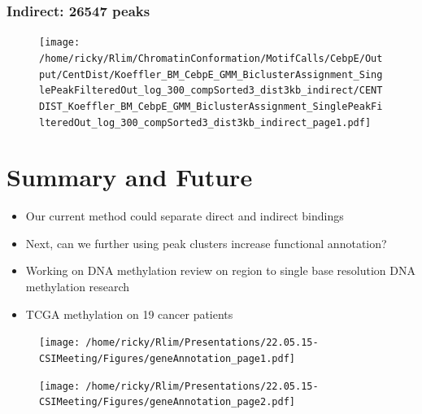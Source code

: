 \documentclass[notes]{beamer}
\begin{document}
\begin{frame}[plain]
    \frametitle{Indirect: 26547 peaks}
    \begin{figure}
        \texttt{[image: /home/ricky/Rlim/ChromatinConformation/MotifCalls/CebpE/Output/CentDist/Koeffler\_BM\_CebpE\_GMM\_BiclusterAssignment\_SinglePeakFilteredOut\_log\_300\_compSorted3\_dist3kb\_indirect/CENTDIST\_Koeffler\_BM\_CebpE\_GMM\_BiclusterAssignment\_SinglePeakFilteredOut\_log\_300\_compSorted3\_dist3kb\_indirect\_page1.pdf]}
    \end{figure}
\end{frame}

\section{Summary and Future}
    \begin{frame}
        \begin{itemize}[<+->]
            \item Our current method could separate direct and indirect bindings 
            \item Next, can we further using peak clusters increase functional annotation?
            \item Working on DNA methylation review on region to single base resolution DNA methylation research
            \item TCGA methylation on 19 cancer patients
        \end{itemize}
    \end{frame} 

\begin{frame}[plain]
    \begin{figure}
        \texttt{[image: /home/ricky/Rlim/Presentations/22.05.15-CSIMeeting/Figures/geneAnnotation\_page1.pdf]}
    \end{figure}
\end{frame}

\begin{frame}[plain]
    \begin{figure}
        \texttt{[image: /home/ricky/Rlim/Presentations/22.05.15-CSIMeeting/Figures/geneAnnotation\_page2.pdf]}
    \end{figure}
\end{frame}
\end{document}
